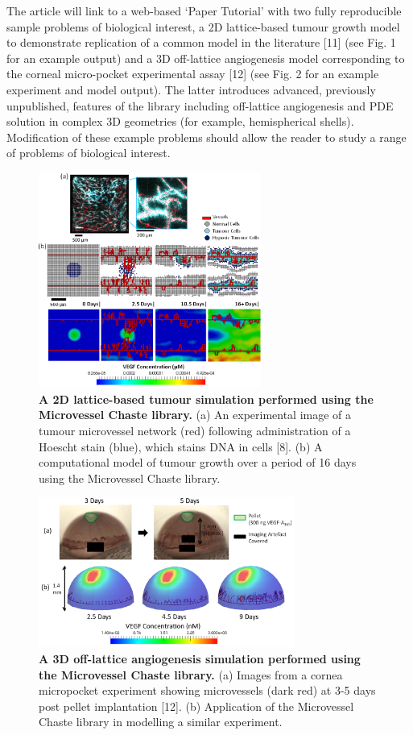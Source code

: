 \documentclass[fullpage,11pt]{article}
\begin{document}
The article will link to a web-based ‘Paper Tutorial’ with two fully reproducible sample problems of biological interest, a 2D lattice-based tumour growth model to demonstrate replication of a common model in the literature [11] (see Fig. 1 for an example output) and a 3D off-lattice angiogenesis model corresponding to the corneal micro-pocket experimental assay [12] (see Fig. 2 for an example experiment and model output). The latter introduces advanced, previously unpublished, features of the library including off-lattice angiogenesis and PDE solution in complex 3D geometries (for example, hemispherical shells). Modification of these example problems should allow the reader to study a range of problems of biological interest.

\begin{figure}[!h]
\centering
\includegraphics[width=0.65\textwidth]{Fig3.png}
\caption{{\bf A 2D lattice-based tumour simulation performed using the Microvessel Chaste library.}
(a) An experimental image of a tumour microvessel network (red) following administration of a Hoescht stain (blue), which stains DNA in cells [8]. (b) A computational model of tumour growth over a period of 16 days using the Microvessel Chaste library.}
\label{fig3}
\end{figure}

\begin{figure}[!h]
\centering
\includegraphics[width=0.75\textwidth]{Fig4.png}
\caption{{\bf A 3D off-lattice angiogenesis simulation performed using the Microvessel Chaste library.}
(a) Images from a cornea micropocket experiment showing microvessels (dark red) at 3-5 days post pellet implantation [12]. (b) Application of the Microvessel Chaste library in modelling a similar experiment.}
\label{fig4}
\end{figure}
\end{document}
